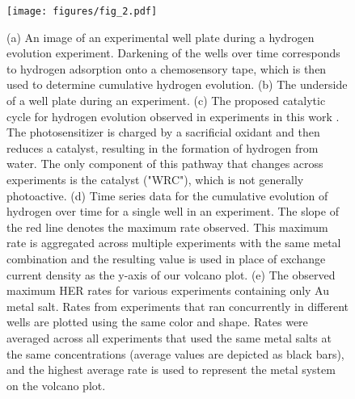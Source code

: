 \documentclass[preprint,12pt]{elsarticle}
\providecommand{\DIFaddbeginFL}{} %
\providecommand{\DIFaddendFL}{} %
\newcommand{\DIFaddincludegraphics}[2][]{{\color{blue}\fbox{\DIFOincludegraphics[#1]{#2}}}} %
\DeclareRobustCommand{\DIFaddbeginFL}{\DIFOaddbeginFL \let\includegraphics\DIFaddincludegraphics} %
\DeclareRobustCommand{\DIFaddendFL}{\DIFOaddendFL \let\includegraphics\DIFOincludegraphics} %
\begin{document}
\begin{figure}[h]
\centering
    \texttt{[image: figures/fig\_2.pdf]}
\caption{(a) An image of an experimental well plate during a hydrogen evolution experiment. Darkening of the wells over time corresponds to hydrogen adsorption onto a chemosensory tape, which is then used to determine cumulative hydrogen evolution. (b) The underside of a well plate during an experiment. (c) The proposed catalytic cycle for hydrogen evolution observed in experiments in this work \cite{lopato2020parallelized}. The photosensitizer is charged by a sacrificial oxidant and then reduces a catalyst, resulting in the formation of hydrogen from water. The only component of this pathway that changes across experiments is the catalyst ("WRC"), which is not generally photoactive. (d) Time series data for the cumulative evolution of hydrogen over time for a single well in an experiment. The slope of the red line denotes the maximum rate observed. This maximum rate is aggregated across multiple experiments with the same metal combination and the resulting value is used in place of exchange current density as the y-axis of our volcano plot. (e) The observed maximum HER rates for various experiments containing only Au metal salt. Rates from experiments that ran concurrently in different wells are plotted using the same color and shape. Rates were averaged across all experiments that used the same metal salts at the same concentrations (average values are depicted as black bars), and the highest average rate is used to represent the metal system on the volcano plot.
}
\DIFaddbeginFL \label{figure_2}
\DIFaddendFL \end{figure}
\end{document}
